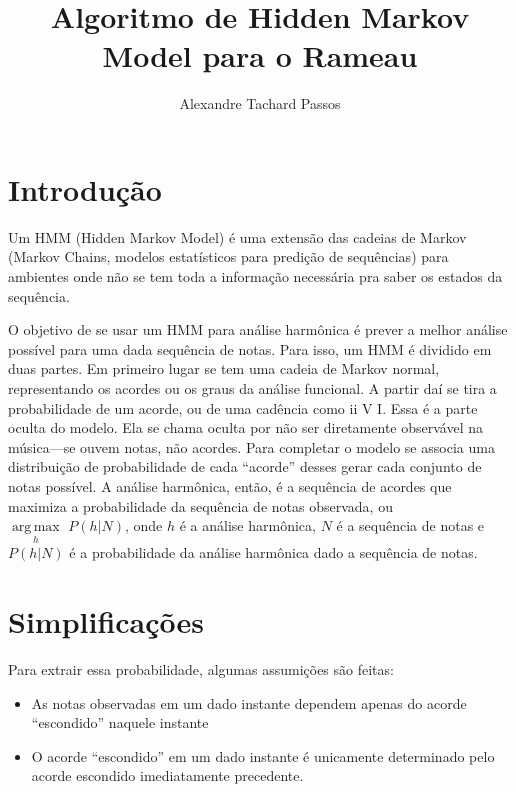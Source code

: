 \documentclass{article}
\title{Algoritmo de Hidden Markov Model para o Rameau}
\author{Alexandre Tachard Passos}
\newcommand{\argmax}[1]{\underset{#1}{\operatorname{arg\,max}}\,}
\begin{document}
\maketitle

\section{Introdução}
\label{sec:intro}

Um HMM (Hidden Markov Model) é uma extensão das cadeias de Markov
(Markov Chains, modelos estatísticos para predição de sequências) para
ambientes onde não se tem toda a informação necessária pra saber os
estados da sequência.
                                                                   
O objetivo de se usar um HMM para análise harmônica é prever a melhor
análise possível para uma dada sequência de notas. Para isso, um HMM é
dividido em duas partes. Em primeiro lugar se tem uma cadeia de Markov
normal, representando os acordes ou os graus da análise funcional. A
partir daí se tira a probabilidade de um acorde, ou de uma cadência
como ii V I. Essa é a parte oculta do modelo. Ela se chama oculta por
não ser diretamente observável na música---se ouvem notas, não
acordes. Para completar o modelo se associa uma distribuição de
probabilidade de cada ``acorde'' desses gerar cada conjunto de notas
possível. A análise harmônica, então, é a sequência de acordes que
maximiza a probabilidade da sequência de notas observada, ou $
\argmax{h} \, P(h|N) $, onde $h$ é a análise
harmônica, $N$ é a sequência de notas e $P(h|N)$ é a probabilidade da
análise harmônica dado a sequência de notas.

\section{Simplificações}
\label{sec:simpl}

Para extrair essa probabilidade, algumas assumições são feitas:    
\begin{itemize}                                                    
 \item As notas observadas em um dado instante dependem apenas do  
   acorde ``escondido'' naquele instante                           
 \item O acorde ``escondido'' em um dado instante é unicamente     
   determinado pelo acorde escondido imediatamente precedente.     
\end{itemize}                                                      
                                                                   
\end{document}
